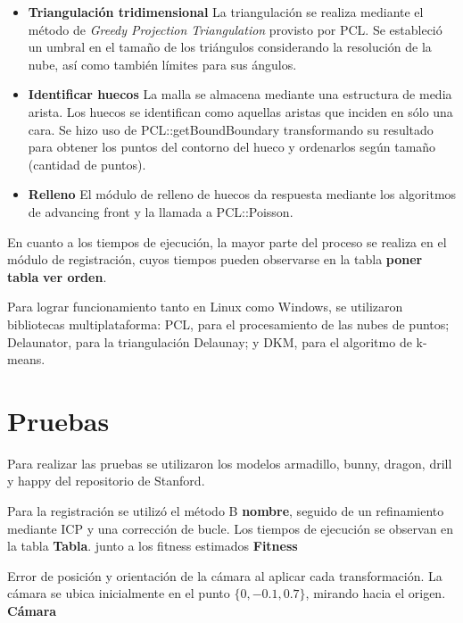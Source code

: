 \documentclass{pfc}
\newcommand{\Alerta}[1]{{\Huge\bfseries\sffamily#1}}
\newcommand{\NombreItem}[1]{{\bfseries#1}}
\begin{document}
\begin{itemize}
			\item  \NombreItem{Triangulación tridimensional}
				La triangulación se realiza mediante el método de \emph{Greedy
				Projection Triangulation} provisto por PCL.
				Se estableció un umbral en el tamaño de los triángulos considerando la resolución de la nube,
				así como también límites para sus ángulos.

			\item  \NombreItem{Identificar huecos}
				La malla se almacena mediante una estructura de media arista. Los
				huecos se identifican como aquellas aristas que inciden en sólo una
				cara.
				Se hizo uso de PCL::getBoundBoundary transformando su resultado para
				obtener los puntos del contorno del hueco y ordenarlos según tamaño
				(cantidad de puntos).

			\item  \NombreItem{Relleno}
				El módulo de relleno de huecos da respuesta mediante los algoritmos de advancing front y
				la llamada a PCL::Poisson.
		\end{itemize}


		En cuanto a  los tiempos de ejecución,
		la mayor parte del proceso se realiza en
		el módulo de registración, cuyos tiempos
		pueden observarse en la tabla \Alerta{poner tabla} \Alerta{ver orden}.

		Para lograr funcionamiento tanto en Linux como Windows,
		se utilizaron bibliotecas multiplataforma:
		PCL, para el procesamiento de las nubes de puntos;
		Delaunator, para la triangulación Delaunay;
		y DKM, para el algoritmo de k-means.

	\section{Pruebas}
		Para realizar las pruebas se utilizaron los modelos
			armadillo,
			bunny,
			dragon,
			drill y
			happy del repositorio de Stanford.

		Para la registración se utilizó el método B \Alerta{nombre}, seguido de
		un refinamiento mediante ICP y una corrección de bucle.
		Los tiempos de ejecución se observan en la tabla \Alerta{Tabla}.
		junto a los fitness estimados
		\Alerta{Fitness}


		Error de posición y orientación de la cámara al aplicar cada transformación.
		La cámara se ubica inicialmente en el punto $\{0, -0.1, 0.7\}$, mirando hacia el origen.
		\Alerta{Cámara}
\end{document}

